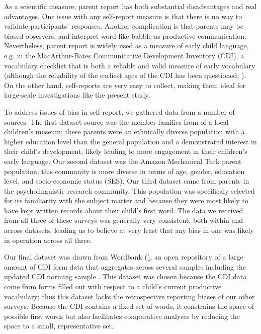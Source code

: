 \documentclass[10pt,letterpaper]{article}
\begin{document}
As a scientific measure, parent report has both substantial disadvantages and real advantages. One issue with any self-report measure is that there is no way to validate participants' responses. Another complication is that parents may be biased observers, and interpret word-like babble as productive communication. Nevertheless, parent report is widely used as a measure of early child language, e.g. in the MacArthur-Bates Communicative Development Inventory (CDI), a vocabulary checklist that is both a reliable and valid measure of early vocabulary \cite{fenson1994,fenson2007} (although the reliability of the earliest ages of the CDI has been questioned; ). On the other hand, self-reports are very easy to collect, making them ideal for large-scale investigations like the present study. 

To address issues of bias in self-report, we gathered data from a number of sources. The first dataset source was the member families from of a local children's museum; these parents were an ethnically diverse population with a higher education level than the general population and a demonstrated interest in their child's development, likely leading to more engagement in their children's early language. Our second dataset was the Amazon Mechanical Turk parent population; this community is more diverse in terms of age, gender, education level, and socio-economic status (SES). Our third dataset came from parents in the psycholinguistic research community. This population was specificaly selected for its familiarity with the subject matter and because they were most likely to have kept written records about their child's first word. The data we received from all three of these surveys was generally very consistent, both within and across datasets, leading us to believe at very least that any bias in one was likely in operation across all three. 

Our final dataset was drawn from Wordbank (\href{http://wordbank.stanford.edu}), an open repository of a large amount of CDI form data that aggregates across several samples including the updated CDI norming sample \cite{fenson2007}. This dataset was chosen because the CDI data come from forms filled out with respect to a child's current productive vocabulary; thus this dataset lacks the retrospective reporting biases of our other surveys. Because the CDI contains a fixed set of words, it constrains the space of possible first words but also facilitates comparative analyses by reducing the space to a small, representative set.
\end{document}
